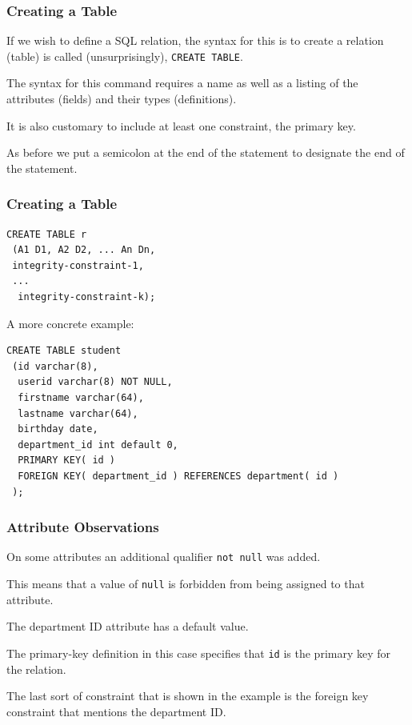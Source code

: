 \begin{frame}
\frametitle{Creating a Table}

If we wish to define a SQL relation, the syntax for this is to create a relation (table) is called (unsurprisingly), \texttt{CREATE TABLE}. 

The syntax for this command requires a name as well as a listing of the attributes (fields) and their types (definitions). 

It is also customary to include at least one constraint, the primary key. 

As before we put a semicolon at the end of the statement to designate the end of the statement. 

\end{frame}

\begin{frame}[fragile]
\frametitle{Creating a Table}


{\small
\begin{verbatim}
CREATE TABLE r
 (A1 D1, A2 D2, ... An Dn,
 integrity-constraint-1,
 ...
  integrity-constraint-k);
\end{verbatim}
}

A more concrete example: 
{\small
\begin{verbatim}
CREATE TABLE student
 (id varchar(8),
  userid varchar(8) NOT NULL,
  firstname varchar(64),
  lastname varchar(64),
  birthday date,
  department_id int default 0,
  PRIMARY KEY( id )
  FOREIGN KEY( department_id ) REFERENCES department( id )
 );
\end{verbatim}
}

\end{frame}


\begin{frame}
\frametitle{Attribute Observations}

On some attributes an additional qualifier \texttt{not null} was added. 

This means that a value of \texttt{null} is forbidden from being assigned to that attribute. 

The department ID attribute has a default value.

The primary-key definition in this case specifies that \texttt{id} is the primary key for the relation.

The last sort of constraint that is shown in the example is the foreign key constraint that mentions the department ID.

\end{frame}

